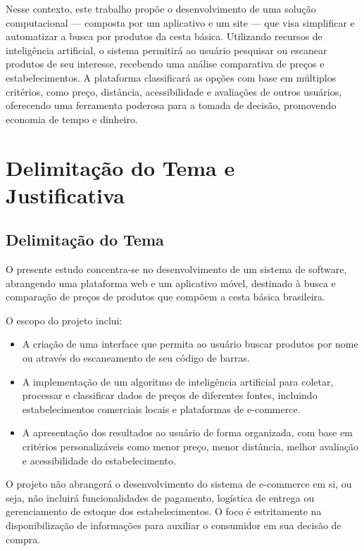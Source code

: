 \documentclass[
  article,      %
  a4paper,      %
  12pt,         %
  oneside,      %
  fleqn         %
]{abntex2}
\begin{document}
Nesse contexto, este trabalho propõe o desenvolvimento de uma solução computacional — composta por um aplicativo e um site — que visa simplificar e automatizar a busca por produtos da cesta básica. Utilizando recursos de inteligência artificial, o sistema permitirá ao usuário pesquisar ou escanear produtos de seu interesse, recebendo uma análise comparativa de preços e estabelecimentos. A plataforma classificará as opções com base em múltiplos critérios, como preço, distância, acessibilidade e avaliações de outros usuários, oferecendo uma ferramenta poderosa para a tomada de decisão, promovendo economia de tempo e dinheiro.

\section{Delimitação do Tema e Justificativa}

\subsection{Delimitação do Tema}

O presente estudo concentra-se no desenvolvimento de um sistema de software, abrangendo uma plataforma web e um aplicativo móvel, destinado à busca e comparação de preços de produtos que compõem a cesta básica brasileira.

O escopo do projeto inclui:
\begin{itemize}
    \item A criação de uma interface que permita ao usuário buscar produtos por nome ou através do escaneamento de seu código de barras.
    \item A implementação de um algoritmo de inteligência artificial para coletar, processar e classificar dados de preços de diferentes fontes, incluindo estabelecimentos comerciais locais e plataformas de e-commerce.
    \item A apresentação dos resultados ao usuário de forma organizada, com base em critérios personalizáveis como menor preço, menor distância, melhor avaliação e acessibilidade do estabelecimento.
\end{itemize}

O projeto não abrangerá o desenvolvimento do sistema de e-commerce em si, ou seja, não incluirá funcionalidades de pagamento, logística de entrega ou gerenciamento de estoque dos estabelecimentos. O foco é estritamente na disponibilização de informações para auxiliar o consumidor em sua decisão de compra.
\end{document}
